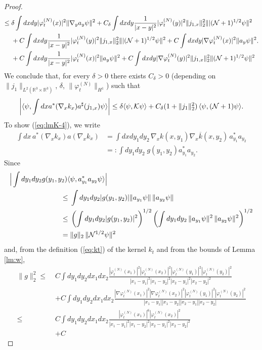 \documentclass[11pt,a4paper]{article}
\newcommand{\bR}{{\mathbb R}}
\newcommand{\cK}{{\cal K}}
\newcommand{\cN}{{\cal N}}
\begin{document}
\begin{proof}
\[\begin{split}
\leq \; &\delta \int dx dy |\varphi_t^{(N)} (x)|^2 \| \nabla_y a_y \psi \|^2 + C_\delta \int dx dy \frac{1}{|x-y|^2} |\varphi^{(N)}_t (y)|^2 \|j_{1,x}\|_2^2 \| |(\cN+1)^{1/2} \psi \|^2 \\ &
+C \int dx dy \frac{1}{|x-y|^2} |\varphi^{(N)}_t (y)|^2 \|j_{1,x}\|_2^2 \| |(\cN+1)^{1/2} \psi \|^2 + 
C \int dx dy | \nabla \varphi_t^{(N)} (x)|^2 \| a_y \psi \|^2 \\
&+C\int dx dy \frac{1}{|x-y|^2} |\varphi_t^{(N)} (x)|^2 \| a_y \psi \|^2 
+ C \int dx dy |\nabla \varphi_t^{(N)} (y)|^2  \|j_{1,x} \|_2^2 \| (\cN+1)^{1/2} \psi \|^2 \end{split}. \]
We conclude that, for every $\delta >0$ there exists $C_\delta > 0$ (depending on $ \| j_1 \|_{L^2 (\bR^3 \times \bR^3)}$, $\delta$, $\| \varphi_t^{(N)} \|_{H^1}$) such that 
\[ \left| \langle \psi , \int dx a^* (\nabla_x k_x) a^\sharp (j_{1,x}) \psi \rangle \right| \leq \delta \langle \psi , \cK \psi \rangle + C_\delta (1+  \| j_1 \|_2^2 ) \, \langle \psi , (\cN + 1) \psi \rangle. \]
To show (\ref{eq:lmK-4}), we write
\[  \begin{split} \int dx  \, a^* (\nabla_x k_x) a (\nabla_x k_x) & = \int dx dy_1 dy_2 \, \nabla_x k (x,y_1) \nabla_x \overline{k} (x,y_2) \, a_{y_1}^* a_{y_2} \\ & =: \int dy_1 dy_2 \; g (y_1, y_2) a_{y_1}^* a_{y_2}. \end{split} \]
Since
\[ \begin{split} \Big| \int dy_1 dy_2 g (y_1 , y_2) \langle &\psi , a_{y_1}^* a_{y_2} \psi \rangle \Big| \\ \leq \; & \int dy_1 dy_2 |g (y_1 , y_2)| \| a_{y_1} \psi \| \, \|  a_{y_2} \psi \| \\ \leq  \; & \left(\int dy_1 dy_2 |g (y_1 , y_2)|^2 \right)^{1/2}  \left( \int dy_1 dy_2 \, \| a_{y_1} \psi \|^2 \, \|  a_{y_2} \psi \|^2 \right)^{1/2} \\ = \; & \| g \|_2 \, \| \cN^{1/2} \psi \|^2 \end{split} \] 
and, from the definition (\ref{eq:kt}) of the kernel $k_t$ and from the bounds of Lemma \ref{lm:w}, 
\[ \begin{split} \| g \|_2^2 \leq \; &C \int dy_1 dy_2 dx_1 dx_2  \frac{|\varphi_t^{(N)} (x_1)|^2 |\varphi_t^{(N)} (x_2)|^2 |\varphi_t^{(N)} (y_1)|^2 |\varphi_t^{(N)} (y_2)|^2}{|x_1 - y_1|^2 |x_1 - y_2|^2 |x_2-y_1|^2 |x_2 - y_2|^2}  \\ &+C \int dy_1 dy_2 dx_1 dx_2 \frac{|\nabla \varphi_t^{(N)} (x_1)|^2 |\nabla \varphi_t^{(N)} (x_2)|^2 |\varphi_t^{(N)} (y_1)|^2 |\varphi_t^{(N)} (y_2)|^2}{|x_1 - y_1| |x_1 - y_2| |x_2-y_1| |x_2 - y_2|} \\  \leq \;& C \int dy_1 dy_2 dx_1 dx_2  \frac{|\varphi_t^{(N)} (x_1)|^6 |\varphi_t^{(N)} (x_2)|^2}{|x_1 - y_1|^2 |x_1 - y_2|^2 |x_2-y_1|^2 |x_2 - y_2|^2} \\ &+C 

\end{split}\]
\end{proof}
\end{document}
